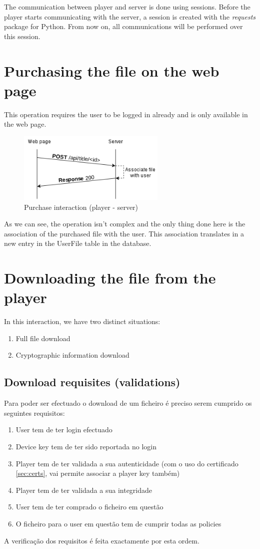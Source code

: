 \documentclass[11pt,a4paper]{report}
\begin{document}
The communication between player and server is done using sessions. Before the player starts communicating with the server, a session is created with the \emph{requests} package for Python.
From now on, all communications will be performed over this session.

\section{Purchasing the file on the web page}
This operation requires the user to be logged in already and is only available in the web page.

\begin{figure}[H]
\centerline{\includegraphics[width=200pt]{images/buyTitle.png}}
\caption{Purchase interaction (player - server)}
\label{player}
\end{figure}

As we can see, the operation isn't complex and the only thing done here is the association of the purchased file with the user.
This association translates in a new entry in the UserFile table in the database.

\section{Downloading the file from the player}
In this interaction, we have two distinct situations:
\begin{enumerate}
  \item Full file download
  \item Cryptographic information download
\end{enumerate}

\subsection{Download requisites (validations)}
\label{sec:requ}
Para poder ser efectuado o download de um ficheiro é preciso serem cumprido os seguintes requisitos:
\begin{enumerate}
\item User tem de ter login efectuado
\item Device key tem de ter sido reportada no login
\item Player tem de ter validada a sua autenticidade (com o uso do certificado \autoref{sec:certs}, vai permite associar a player key também)
\item Player tem de ter validada a sua integridade
\item User tem de ter comprado o ficheiro em questão
\item O ficheiro para o user em questão tem de cumprir todas as policies
\end{enumerate}
A verificação dos requisitos é feita exactamente por esta ordem.
\end{document}
